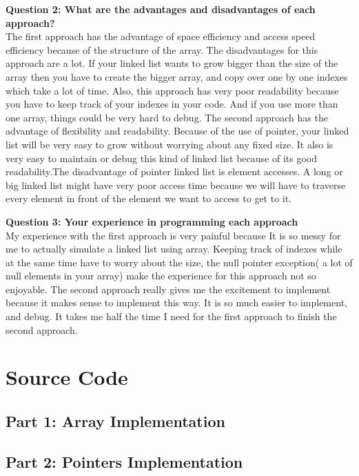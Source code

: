 \documentclass{article}
\begin{document}
\textbf{Question 2: What are the advantages and disadvantages of each
approach?}\\ The first approach has the advantage of space efficiency and access
speed efficiency because of the structure of the array. The disadvantages for this approach are a lot. If your linked list wants to grow bigger than the size of the array then you have to create the bigger array, and copy over one by one indexes which take a lot of time. Also, this approach has very poor readability because you have to keep track of your indexes in your code. And if you use more than one array, things could be very hard to debug.
	 The second approach has the advantage of flexibility and readability. Because of the use of pointer, your linked list will be very easy to grow without worrying about any fixed size. It also is very easy to maintain or debug this kind of linked list because of its good readability.The disadvantage of pointer linked list is element accesses. A long or big linked list might have very poor access time because we will have to traverse every element in front of the element we want to access to get to it.

\textbf{Question 3: Your experience in programming each approach}\\
	My experience with the first approach is very painful because It is so messy for me to actually simulate a linked list using array. Keeping track of indexes while at the same time have to worry about the size, the null pointer exception( a lot of null elements in your array) make the experience for this approach not so enjoyable.
	The second approach really gives me the excitement to implement because it makes sense to implement this way. It is so much easier to implement, and debug. It takes me half the time I need for the first approach to finish the second approach.
\newpage

\section{Source Code}
\subsection{Part 1: Array Implementation}
\subsection{Part 2: Pointers Implementation}
\end{document}
